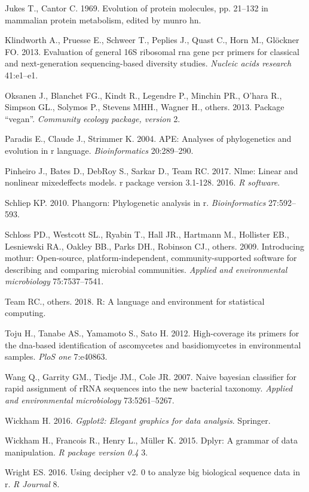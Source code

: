 \documentclass[11pt,]{article}
\begin{document}
\hypertarget{ref-jukes1969evolution}{}
Jukes T., Cantor C. 1969. Evolution of protein molecules, pp. 21--132 in
mammalian protein metabolism, edited by munro hn.

\hypertarget{ref-klindworth2013evaluation}{}
Klindworth A., Pruesse E., Schweer T., Peplies J., Quast C., Horn M.,
Glöckner FO. 2013. Evaluation of general 16S ribosomal rna gene pcr
primers for classical and next-generation sequencing-based diversity
studies. \emph{Nucleic acids research} 41:e1--e1.

\hypertarget{ref-oksanen2013package}{}
Oksanen J., Blanchet FG., Kindt R., Legendre P., Minchin PR., O'hara R.,
Simpson GL., Solymos P., Stevens MHH., Wagner H., others. 2013. Package
``vegan''. \emph{Community ecology package, version} 2.

\hypertarget{ref-paradis2004ape}{}
Paradis E., Claude J., Strimmer K. 2004. APE: Analyses of phylogenetics
and evolution in r language. \emph{Bioinformatics} 20:289--290.

\hypertarget{ref-pinheiro2017nlme}{}
Pinheiro J., Bates D., DebRoy S., Sarkar D., Team RC. 2017. Nlme: Linear
and nonlinear mixedeffects models. r package version 3.1-128. 2016.
\emph{R software}.

\hypertarget{ref-schliep2010phangorn}{}
Schliep KP. 2010. Phangorn: Phylogenetic analysis in r.
\emph{Bioinformatics} 27:592--593.

\hypertarget{ref-schloss2009introducing}{}
Schloss PD., Westcott SL., Ryabin T., Hall JR., Hartmann M., Hollister
EB., Lesniewski RA., Oakley BB., Parks DH., Robinson CJ., others. 2009.
Introducing mothur: Open-source, platform-independent,
community-supported software for describing and comparing microbial
communities. \emph{Applied and environmental microbiology}
75:7537--7541.

\hypertarget{ref-team2018r}{}
Team RC., others. 2018. R: A language and environment for statistical
computing.

\hypertarget{ref-toju2012high}{}
Toju H., Tanabe AS., Yamamoto S., Sato H. 2012. High-coverage its
primers for the dna-based identification of ascomycetes and
basidiomycetes in environmental samples. \emph{PloS one} 7:e40863.

\hypertarget{ref-wang2007naive}{}
Wang Q., Garrity GM., Tiedje JM., Cole JR. 2007. Naive bayesian
classifier for rapid assignment of rRNA sequences into the new bacterial
taxonomy. \emph{Applied and environmental microbiology} 73:5261--5267.

\hypertarget{ref-wickham2016ggplot2}{}
Wickham H. 2016. \emph{Ggplot2: Elegant graphics for data analysis}.
Springer.

\hypertarget{ref-wickham2015dplyr}{}
Wickham H., Francois R., Henry L., Müller K. 2015. Dplyr: A grammar of
data manipulation. \emph{R package version 0.4} 3.

\hypertarget{ref-wright2016using}{}
Wright ES. 2016. Using decipher v2. 0 to analyze big biological sequence
data in r. \emph{R Journal} 8.




\newpage
\singlespacing 
\end{document}
